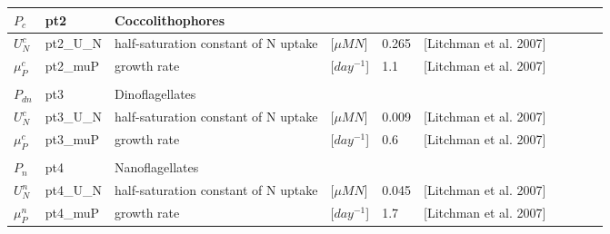 \documentclass[letterpaper,10pt]{article}
\begin{document}
\begin{tabular}{llllllllll}
  $P_{c}$ & pt2 & Coccolithophores\\
  \hline
  $U^{c}_N$ & pt2\_U\_N & half-saturation constant of N uptake & [$\mu M N$]  &  0.265 & [Litchman et al. 2007]\\
  $\mu^{c}_P$ & pt2\_muP  & growth rate & [$day^{-1}$]& 1.1 & [Litchman et al. 2007] \\
  \\
  $P_{dn}$ & pt3 & Dinoflagellates\\
  \hline
  $U^{c}_N$ & pt3\_U\_N & half-saturation constant of N uptake & [$\mu M N$]  &  0.009 & [Litchman et al. 2007]\\
  $\mu^{c}_P$ & pt3\_muP  & growth rate & [$day^{-1}$] & 0.6 & [Litchman et al. 2007]\\
  \\
  $P_{n}$ & pt4 & Nanoflagellates\\
  \hline
  $U^{n}_N$ & pt4\_U\_N & half-saturation constant of N uptake & [$\mu M N$]  &  0.045 & [Litchman et al. 2007]\\
  $\mu^{n}_P$ & pt4\_muP  & growth rate & [$day^{-1}$] & 1.7 & [Litchman et al. 2007]\\


\end{tabular}
\end{document}
